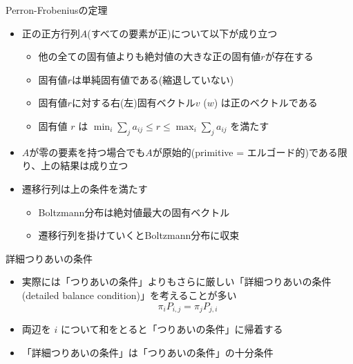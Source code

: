 \documentclass[dvipdfmx]{beamer}
\begin{document}
\begin{frame}[t,fragile]{Perron-Frobeniusの定理}
  \begin{itemize}
  \item 正の正方行列$A$(すべての要素が正)について以下が成り立つ
    \begin{itemize}
      \item 他の全ての固有値よりも絶対値の大きな正の固有値$r$が存在する
      \item 固有値$r$は単純固有値である(縮退していない)
      \item 固有値$r$に対する右(左)固有ベクトル$v$ ($w$) は正のベクトルである
      \item 固有値 $r$ は $\displaystyle \min_i \sum_j a_{ij} \le r \le \max_i \sum_j a_{ij}$ を満たす
    \end{itemize}
  \item $A$が零の要素を持つ場合でも$A$が原始的(primitive = エルゴード的)である限り、上の結果は成り立つ
  \item 遷移行列は上の条件を満たす
    \begin{itemize}
    \item Boltzmann分布は絶対値最大の固有ベクトル
    \item 遷移行列を掛けていくとBoltzmann分布に収束
    \end{itemize}
  \end{itemize}
\end{frame}

\begin{frame}[t,fragile]{詳細つりあいの条件}
  \begin{itemize}
    \setlength{\itemsep}{1em}
  \item 実際には「つりあいの条件」よりもさらに厳しい「詳細つりあいの条件 (detailed balance condition)」を考えることが多い
    \[ \pi_i P_{i,j} = \pi_j P_{j,i} \]
  \item 両辺を $i$ について和をとると「つりあいの条件」に帰着する
  \item 「詳細つりあいの条件」は「つりあいの条件」の十分条件
  \end{itemize}
\end{frame}
\end{document}
